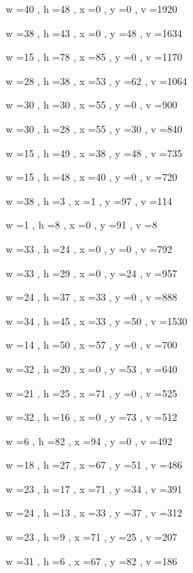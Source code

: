 \documentclass[11pt]{article}
\begin{document}
w =40 , h =48 , x =0 , y =0 , v =1920
\par
w =38 , h =43 , x =0 , y =48 , v =1634
\par
w =15 , h =78 , x =85 , y =0 , v =1170
\par
w =28 , h =38 , x =53 , y =62 , v =1064
\par
w =30 , h =30 , x =55 , y =0 , v =900
\par
w =30 , h =28 , x =55 , y =30 , v =840
\par
w =15 , h =49 , x =38 , y =48 , v =735
\par
w =15 , h =48 , x =40 , y =0 , v =720
\par
w =38 , h =3 , x =1 , y =97 , v =114
\par
w =1 , h =8 , x =0 , y =91 , v =8
\par
\newpage




w =33 , h =24 , x =0 , y =0 , v =792
\par
w =33 , h =29 , x =0 , y =24 , v =957
\par
w =24 , h =37 , x =33 , y =0 , v =888
\par
w =34 , h =45 , x =33 , y =50 , v =1530
\par
w =14 , h =50 , x =57 , y =0 , v =700
\par
w =32 , h =20 , x =0 , y =53 , v =640
\par
w =21 , h =25 , x =71 , y =0 , v =525
\par
w =32 , h =16 , x =0 , y =73 , v =512
\par
w =6 , h =82 , x =94 , y =0 , v =492
\par
w =18 , h =27 , x =67 , y =51 , v =486
\par
w =23 , h =17 , x =71 , y =34 , v =391
\par
w =24 , h =13 , x =33 , y =37 , v =312
\par
w =23 , h =9 , x =71 , y =25 , v =207
\par
w =31 , h =6 , x =67 , y =82 , v =186
\par
\newpage
\end{document}
